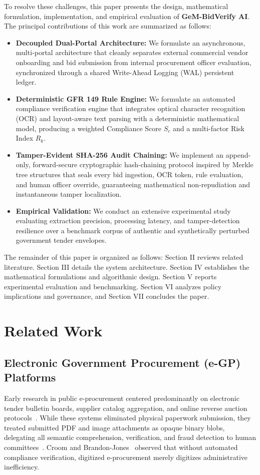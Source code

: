 \documentclass[conference]{IEEEtran}
\begin{document}
To resolve these challenges, this paper presents the design, mathematical formulation, implementation, and empirical evaluation of \textbf{GeM-BidVerify AI}. The principal contributions of this work are summarized as follows:
\begin{itemize}
    \item \textbf{Decoupled Dual-Portal Architecture:} We formulate an asynchronous, multi-portal architecture that cleanly separates external commercial vendor onboarding and bid submission from internal procurement officer evaluation, synchronized through a shared Write-Ahead Logging (WAL) persistent ledger.
    \item \textbf{Deterministic GFR 149 Rule Engine:} We formulate an automated compliance verification engine that integrates optical character recognition (OCR) and layout-aware text parsing with a deterministic mathematical model, producing a weighted Compliance Score $S_c$ and a multi-factor Risk Index $R_k$.
    \item \textbf{Tamper-Evident SHA-256 Audit Chaining:} We implement an append-only, forward-secure cryptographic hash-chaining protocol inspired by Merkle tree structures that seals every bid ingestion, OCR token, rule evaluation, and human officer override, guaranteeing mathematical non-repudiation and instantaneous tamper localization.
    \item \textbf{Empirical Validation:} We conduct an extensive experimental study evaluating extraction precision, processing latency, and tamper-detection resilience over a benchmark corpus of authentic and synthetically perturbed government tender envelopes.
\end{itemize}

The remainder of this paper is organized as follows: Section II reviews related literature. Section III details the system architecture. Section IV establishes the mathematical formulations and algorithmic design. Section V reports experimental evaluation and benchmarking. Section VI analyzes policy implications and governance, and Section VII concludes the paper.

\section{Related Work}

\subsection{Electronic Government Procurement (e-GP) Platforms}
Early research in public e-procurement centered predominantly on electronic tender bulletin boards, supplier catalog aggregation, and online reverse auction protocols~\cite{vaidya2006}. While these systems eliminated physical paperwork submission, they treated submitted PDF and image attachments as opaque binary blobs, delegating all semantic comprehension, verification, and fraud detection to human committees~\cite{neupane2012}. Croom and Brandon-Jones~\cite{croom2007} observed that without automated compliance verification, digitized e-procurement merely digitizes administrative inefficiency.
\end{document}
